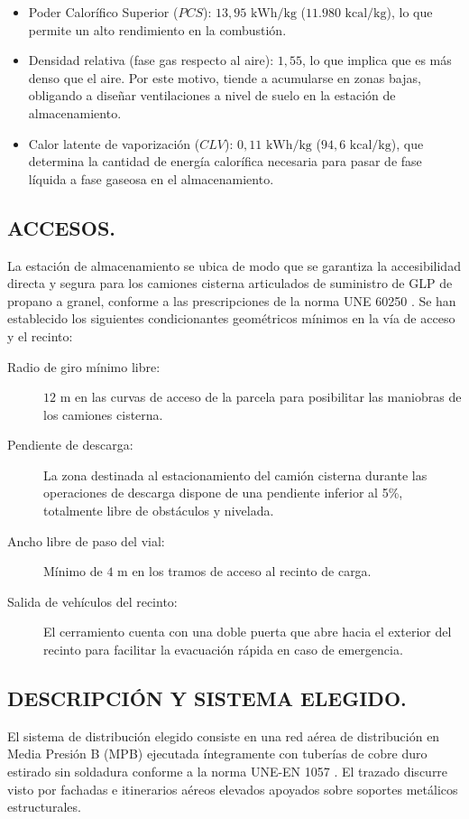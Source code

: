 \documentclass[12pt]{article}
\begin{document}
        \begin{itemize}
            \item Poder Calorífico Superior ($PCS$): $13,95\text{ kWh/kg}$ ($11.980\text{ kcal/kg}$), lo que permite un alto rendimiento en la combustión.
            \item Densidad relativa (fase gas respecto al aire): $1,55$, lo que implica que es más denso que el aire. Por este motivo, tiende a acumularse en zonas bajas, obligando a diseñar ventilaciones a nivel de suelo en la estación de almacenamiento.
            \item Calor latente de vaporización ($CLV$): $0,11\text{ kWh/kg}$ ($94,6\text{ kcal/kg}$), que determina la cantidad de energía calorífica necesaria para pasar de fase líquida a fase gaseosa en el almacenamiento.
        \end{itemize}

        \subsection{ACCESOS.}
        La estación de almacenamiento se ubica de modo que se garantiza la accesibilidad directa y segura para los camiones cisterna articulados de suministro de GLP de propano a granel, conforme a las prescripciones de la norma UNE 60250 \cite{une60250}. Se han establecido los siguientes condicionantes geométricos mínimos en la vía de acceso y el recinto:
        
        \begin{description}
            \item[Radio de giro mínimo libre:] $12\text{ m}$ en las curvas de acceso de la parcela para posibilitar las maniobras de los camiones cisterna.
            \item[Pendiente de descarga:] La zona destinada al estacionamiento del camión cisterna durante las operaciones de descarga dispone de una pendiente inferior al 5\%, totalmente libre de obstáculos y nivelada.
            \item[Ancho libre de paso del vial:] Mínimo de $4\text{ m}$ en los tramos de acceso al recinto de carga.
            \item[Salida de vehículos del recinto:] El cerramiento cuenta con una doble puerta que abre hacia el exterior del recinto para facilitar la evacuación rápida en caso de emergencia.
        \end{description}

        \subsection{DESCRIPCIÓN Y SISTEMA ELEGIDO.}
        El sistema de distribución elegido consiste en una red aérea de distribución en Media Presión B (MPB) ejecutada íntegramente con tuberías de cobre duro estirado sin soldadura conforme a la norma UNE-EN 1057 \cite{une1057}. El trazado discurre visto por fachadas e itinerarios aéreos elevados apoyados sobre soportes metálicos estructurales.
        
\end{document}

